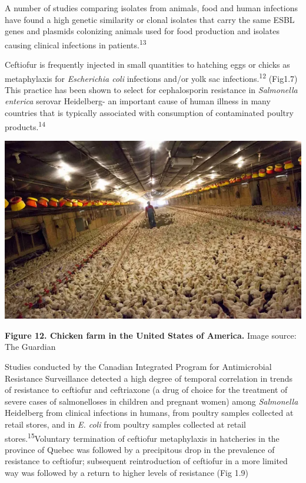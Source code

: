 \documentclass[
]{book}
\begin{document}
A number of studies comparing isolates from animals, food and human infections have found a high genetic similarity or clonal isolates that carry the same ESBL genes and plasmids colonizing animals used for food production and isolates causing clinical infections in patients.\textsuperscript{13}

Ceftiofur is frequently injected in small quantities to hatching eggs or chicks as metaphylaxis for \emph{Escherichia coli} infections and/or yolk sac infections.\textsuperscript{12} (Fig1.7) This practice has been shown to select for cephalosporin resistance in \emph{Salmonella enterica} serovar Heidelberg- an important cause of human illness in many countries that is typically associated with consumption of contaminated poultry products.\textsuperscript{14}

\includegraphics[width=8.33333in,height=\textheight]{images/chicken_farm.png}

\textbf{Figure 12. Chicken farm in the United States of America.} Image source: The Guardian

Studies conducted by the Canadian Integrated Program for Antimicrobial Resistance Surveillance detected a high degree of temporal correlation in trends of resistance to ceftiofur and ceftriaxone (a drug of choice for the treatment of severe cases of salmonelloses in children and pregnant women) among \emph{Salmonella} Heidelberg from clinical infections in humans, from poultry samples collected at retail stores, and in \emph{E. coli} from poultry samples collected at retail stores.\textsuperscript{15}Voluntary termination of ceftiofur metaphylaxis in hatcheries in the province of Quebec was followed by a precipitous drop in the prevalence of resistance to ceftiofur; subsequent reintroduction of ceftiofur in a more limited way was followed by a return to higher levels of resistance (Fig 1.9)
\end{document}

